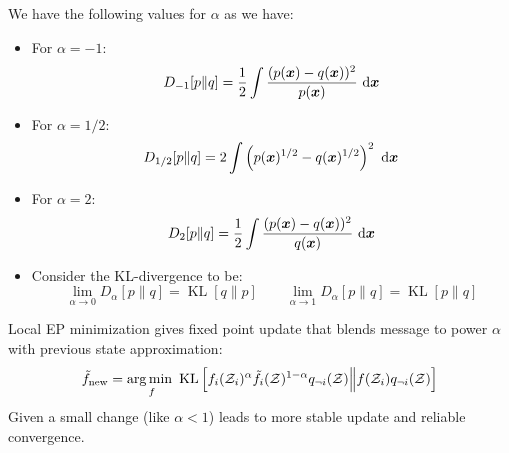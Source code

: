 \begin{remark}
    We have the following values for $\alpha$ as we have:
    \begin{itemize}
        \item For $\alpha = -1$:
        \begin{equation*}
            D_{-1}[p\| q] = \frac{1}{2}\int \frac{(p(\boldsymbol x)-q(\boldsymbol x))^2}{p(\boldsymbol x)}\ \mathrm{d} \boldsymbol x
        \end{equation*}
        \item For $\alpha = 1/2$:
        \begin{equation*}
            D_{1/2}[p\|q] = 2 \int\left( p(\boldsymbol x)^{1/2} - q(\boldsymbol x)^{1/2} \right)^2\ \mathrm{d} \boldsymbol x
        \end{equation*}
        \item For $\alpha = 2$:
        \begin{equation*}
            D_2[p\|q] = \frac{1}{2}\int \frac{(p(\boldsymbol x)-q(\boldsymbol x))^2}{q(\boldsymbol x)}\ \mathrm{d} \boldsymbol x
        \end{equation*}
        \item Consider the KL-divergence to be:
        \begin{equation*}
            \lim_{\alpha\rightarrow0}D_\alpha[p\| q] = \operatorname{KL}[q\| p] \qquad \lim_{\alpha\rightarrow1}D_\alpha[p\| q] = \operatorname{KL}[p\| q] 
        \end{equation*}
    \end{itemize}
\end{remark}

\begin{remark}
    Local EP minimization gives fixed point update that blends message to power $\alpha$ with previous state approximation:
    \begin{equation*}
        \tilde{f}_\text{new} = \underset{f}{\arg\min \ } \operatorname{KL}\left[  f_i(\mathcal{Z}_i)^\alpha \tilde{f}_i(\mathcal{Z})^{1-\alpha} q_{\neg i}(\mathcal{Z}) \Big\| f(\mathcal{Z}_i)q_{\neg i}(\mathcal{Z})  \right]
    \end{equation*}
    Given a small change (like $\alpha<1$) leads to more stable update and reliable convergence. 
\end{remark}


